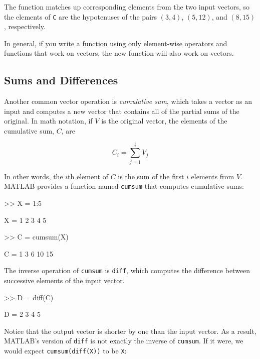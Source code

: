 The function matches up corresponding elements from the two
input vectors, so the elements of \lstinline{C} are the hypotenuses of
the pairs $(3,4)$, $(5,12)$, and $(8,15)$, respectively.

In general, if you write a function using only element-wise
operators and functions that work on vectors, the new
function will also work on vectors.


\subsection{Sums and Differences}

Another common vector operation is \emph{cumulative sum}, which takes a vector as an input and computes a new vector that contains all of the partial sums of the original.  In math notation, if $V$ is the original vector, the elements of the cumulative sum, $C$, are


\begin{equation*}
C_i = \sum_{j=1}^i V_j
\end{equation*}

In other words, the $i$th element of $C$ is the sum of the first
$i$ elements from $V$.  MATLAB provides a function named \lstinline{cumsum} that computes cumulative sums:


\begin{code}
>> X = 1:5

X = 1     2     3     4     5

>> C = cumsum(X)

C = 1     3     6    10    15
\end{code}

The inverse operation of \lstinline{cumsum} is \lstinline{diff}, which computes
the difference between successive elements of the input vector.


\begin{code}
>> D = diff(C)

D = 2     3     4     5
\end{code}

Notice that the output vector is shorter by one than the input
vector.  As a result, MATLAB's version of \lstinline{diff} is not
exactly the inverse of \lstinline{cumsum}.  If it were, we would
expect \lstinline{cumsum(diff(X))} to be \lstinline{X}:

